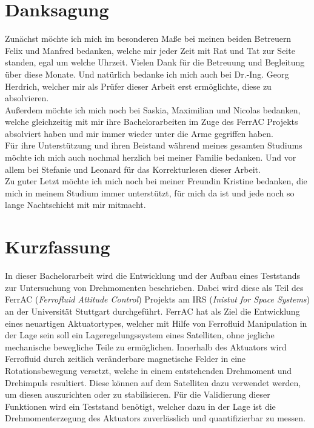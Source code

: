 \chapter*{Danksagung}
Zunächst möchte ich mich im besonderen Maße bei meinen beiden Betreuern Felix und Manfred bedanken, welche mir jeder Zeit mit Rat und Tat zur Seite standen, egal um welche Uhrzeit. Vielen Dank für die Betreuung und Begleitung über diese Monate. Und natürlich bedanke ich mich auch bei Dr.-Ing.  Georg Herdrich, welcher mir als Prüfer dieser Arbeit erst ermöglichte, diese zu absolvieren.\\

Außerdem möchte ich mich noch bei Saskia, Maximilian und Nicolas bedanken, welche gleichzeitig mit mir ihre Bachelorarbeiten im Zuge des FerrAC Projekts absolviert haben und mir immer wieder unter die Arme gegriffen haben.\\

Für ihre Unterstützung und ihren Beistand während meines gesamten Studiums möchte ich mich auch nochmal herzlich bei meiner Familie bedanken. Und vor allem bei Stefanie und Leonard für das Korrekturlesen dieser Arbeit. \\

Zu guter Letzt möchte ich mich noch bei meiner Freundin Kristine bedanken, die mich in meinem Studium immer unterstützt, für mich da ist und jede noch so lange Nachtschicht mit mir mitmacht.\\

\newpage

\chapter*{Kurzfassung}
In dieser Bachelorarbeit wird die Entwicklung und der Aufbau eines Teststands zur Untersuchung von Drehmomenten beschrieben. Dabei wird diese als Teil des FerrAC (\textit{Ferrofluid Attitude Control}) Projekts am IRS (\textit{Inistut for Space Systems}) an der Universität Stuttgart durchgeführt. FerrAC hat als Ziel die Entwicklung eines neuartigen Aktuatortypes, welcher mit Hilfe von Ferrofluid Manipulation in der Lage sein soll ein Lageregelungssystem eines Satelliten, ohne jegliche mechanische bewegliche Teile zu ermöglichen. Innerhalb des Aktuators wird Ferrofluid durch zeitlich veränderbare magnetische Felder in eine Rotationsbewegung versetzt, welche in einem entstehenden Drehmoment und Drehimpuls resultiert. Diese können auf dem Satelliten dazu verwendet werden, um diesen auszurichten oder zu stabilisieren. Für die Validierung dieser Funktionen wird ein Teststand benötigt, welcher dazu in der Lage ist die Drehmomenterzegung des Aktuators zuverlässlich und quantifizierbar zu messen.\\

